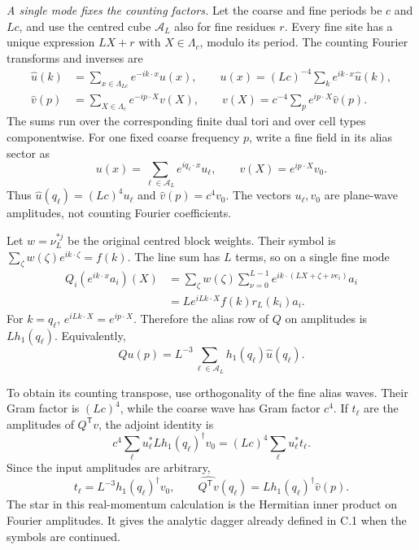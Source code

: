 \documentclass[11pt,reqno]{amsart}
\numberwithin{equation}{section}
\theoremstyle{definition}
\theoremstyle{remark}
\begin{document}
\smallskip\noindent
\emph{A single mode fixes the counting factors.}
Let the coarse and fine periods be \(c\) and \(Lc\), and use
the centred cube \(\mathcal A_L\) also for fine residues
\(r\). Every fine site has a unique expression \(LX+r\)
with \(X\in\Lambda_c\), modulo its period. The counting
Fourier transforms and inverses are
\begin{equation}
 \begin{split}
 \widehat u(k)&=\sum_{x\in\Lambda_{Lc}}e^{-ik\cdot x}u(x),
 \qquad u(x)=(Lc)^{-4}\sum_k e^{ik\cdot x}\widehat u(k),\\
 \widehat v(p)&=\sum_{X\in\Lambda_c}e^{-ip\cdot X}v(X),
 \qquad v(X)=c^{-4}\sum_p e^{ip\cdot X}\widehat v(p).
 \end{split}
 \label{eq:calibration-counting-Fourier}
\end{equation}
The sums run over the corresponding finite dual tori and over
cell types componentwise. For one fixed coarse frequency \(p\),
write a fine field in its alias sector as
\[
 u(x)=\sum_{\ell\in\mathcal A_L}e^{iq_\ell\cdot x}u_\ell,
                         \qquad v(X)=e^{ip\cdot X}v_0.
\]
Thus \(\widehat u(q_\ell)=(Lc)^4u_\ell\) and
\(\widehat v(p)=c^4v_0\). The vectors \(u_\ell,v_0\)
are plane-wave amplitudes, not counting Fourier coefficients.

Let \(w=\nu_L^{*j}\) be the original centred block weights.
Their symbol is \(\sum_\zeta w(\zeta)e^{ik\cdot\zeta}=f(k)\).
The line sum has \(L\) terms, so on a single fine mode
\begin{align*}
 Q_i(e^{ik\cdot x}a_i)(X)
 &=\sum_\zeta w(\zeta)\sum_{\nu=0}^{L-1}
                   e^{ik\cdot(LX+\zeta+\nu e_i)}a_i\\
 &=L e^{iLk\cdot X}f(k)r_L(k_i)a_i.
\end{align*}
For \(k=q_\ell\), \(e^{iLk\cdot X}=e^{ip\cdot X}\).
Therefore the alias row of \(Q\) on amplitudes is
\(Lh_1(q_\ell)\). Equivalently,
\begin{equation}
 \widehat{Qu}(p)=L^{-3}\sum_{\ell\in\mathcal A_L}
                                    h_1(q_\ell)\widehat u(q_\ell).
 \label{eq:calibration-Q-counting-row}
\end{equation}

To obtain its counting transpose, use orthogonality of the
fine alias waves. Their Gram factor is \((Lc)^4\), while
the coarse wave has Gram factor \(c^4\). If \(t_\ell\)
are the amplitudes of \(Q^{\mathsf T}v\), the adjoint identity is
\[
 c^4\sum_\ell u_\ell^*Lh_1(q_\ell)^\dagger v_0
                       =(Lc)^4\sum_\ell u_\ell^*t_\ell.
\]
Since the input amplitudes are arbitrary,
\begin{equation}
 t_\ell=L^{-3}h_1(q_\ell)^\dagger v_0,
       \qquad \widehat{Q^{\mathsf T}v}(q_\ell)
                              =Lh_1(q_\ell)^\dagger\widehat v(p).
 \label{eq:calibration-Q-transpose-factors}
\end{equation}
The star in this real-momentum calculation is the Hermitian
inner product on Fourier amplitudes. It gives the analytic
dagger already defined in C.1 when the symbols are continued.
\end{document}

